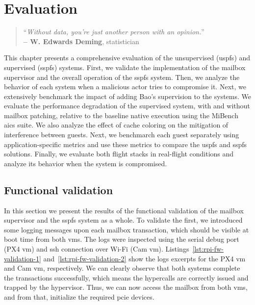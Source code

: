 %
\chapter{Evaluation}
\label{cha:evaluation}
%
\begin{quote}
\begin{flushright}
``\emph{Without data, you're just another person with an opinion.}'' \\
\textbf{-- W. Edwards Deming}, statistician
\end{flushright}
\end{quote}

This chapter presents a comprehensive evaluation of the unsupervised
(\gls{uspfs}) and supervised (\gls{sspfs}) systems. First, we validate the
implementation of the mailbox supervisor and the overall operation of the
\gls{sspfs} system. Then, we analyze the behavior of each system when a malicious
actor tries to compromise it. Next, we extensively benchmark the impact of
adding Bao's supervision to the systems. We evaluate the performance degradation
of the supervised system, with and without mailbox patching, relative to the
baseline native execution using the MiBench \gls{aics} suite. We also analyze
the effect of cache coloring on the mitigation of interference between
guests. Next, we benchmarch each guest separately using application-specific
metrics and  use these metrics to compare the \gls{uspfs} and \gls{sspfs} solutions.
Finally, we evaluate both flight stacks in real-flight conditions and analyze
its behavior when the system is compromised.

\section{Functional validation}
In this section we present the results of the functional validation of the
mailbox supervisor and the \gls{sspfs} system as a whole. To validate the first,
we introduced some logging messages upon each mailbox transaction, which should
be visible at boot time from both \glspl{vm}. The logs were inspected using the
serial debug port (PX4 \gls{vm}) and \gls{ssh} connection over Wi-Fi (Cam \gls{vm}).
%
Listings~\ref{lst:rpi-fw-validation-1} and~\ref{lst:rpi-fw-validation-2} show
the logs excerpts for the PX4 \gls{vm} and Cam \gls{vm}, respectively. We can
clearly observe that both systems complete the transactions successfully, which
means the hypercalls are correctly issued and trapped by the hypervisor. Thus,
we can now access the mailbox from both \glspl{vm}, and from that, initialize
the required \gls{pcie} devices.

